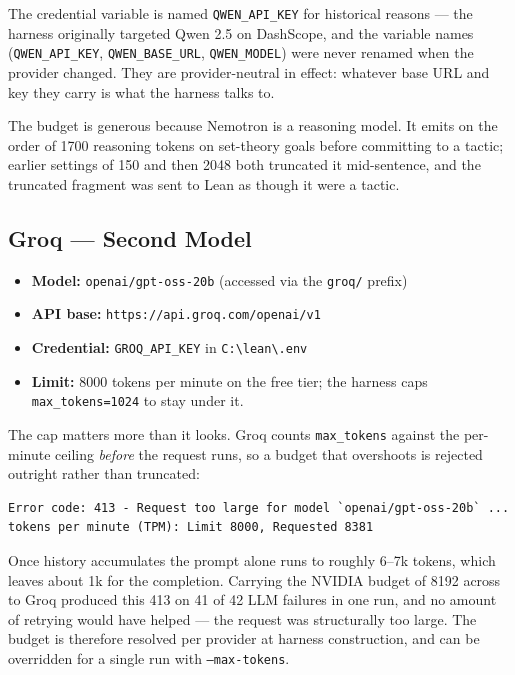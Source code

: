 The credential variable is named \texttt{QWEN\_API\_KEY} for historical
reasons --- the harness originally targeted Qwen 2.5 on DashScope, and the
variable names (\texttt{QWEN\_API\_KEY}, \texttt{QWEN\_BASE\_URL},
\texttt{QWEN\_MODEL}) were never renamed when the provider changed. They are
provider-neutral in effect: whatever base URL and key they carry is what the
harness talks to.

The budget is generous because Nemotron is a reasoning model. It emits on the
order of 1700 reasoning tokens on set-theory goals before committing to a
tactic; earlier settings of 150 and then 2048 both truncated it mid-sentence,
and the truncated fragment was sent to Lean as though it were a tactic.

\subsection{Groq --- Second Model}

\begin{itemize}
  \item \textbf{Model:} \texttt{openai/gpt-oss-20b} (accessed via the \texttt{groq/} prefix)
  \item \textbf{API base:} \texttt{https://api.groq.com/openai/v1}
  \item \textbf{Credential:} \texttt{GROQ\_API\_KEY} in \texttt{C:\textbackslash lean\textbackslash .env}
  \item \textbf{Limit:} 8000 tokens per minute on the free tier; the harness
        caps \texttt{max\_tokens=1024} to stay under it.
\end{itemize}

The cap matters more than it looks. Groq counts \texttt{max\_tokens} against
the per-minute ceiling \emph{before} the request runs, so a budget that
overshoots is rejected outright rather than truncated:

\begin{verbatim}
Error code: 413 - Request too large for model `openai/gpt-oss-20b` ...
tokens per minute (TPM): Limit 8000, Requested 8381
\end{verbatim}

Once history accumulates the prompt alone runs to roughly 6--7k tokens, which
leaves about 1k for the completion. Carrying the NVIDIA budget of 8192 across
to Groq produced this 413 on 41 of 42 LLM failures in one run, and no amount
of retrying would have helped --- the request was structurally too large. The
budget is therefore resolved per provider at harness construction, and can be
overridden for a single run with \texttt{--max-tokens}.

